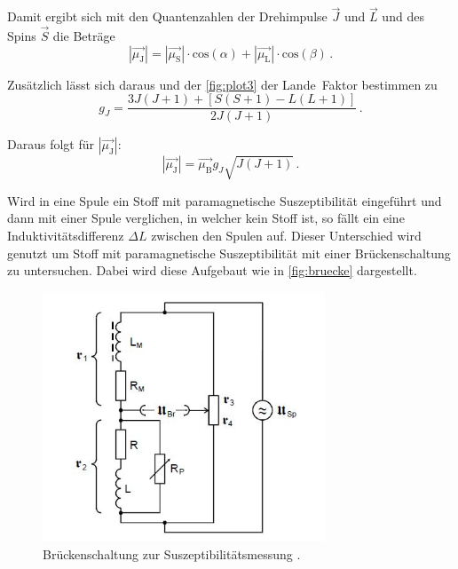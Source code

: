 Damit ergibt sich mit den Quantenzahlen der Drehimpulse $\vec{J}$ und $\vec{L}$ und des Spins $\vec{S}$ die Beträge
\begin{equation*}
        |\vec{\mu_\text{J}}| = |\vec{\mu_\text{S}}| \cdot \text{cos}\left(\alpha \right) + 
        |\vec{\mu_\text{L}}| \cdot \text{cos}\left(\beta \right) \, .
\end{equation*}

Zusätzlich lässt sich daraus und der \autoref{fig:plot3} der Lande~Faktor bestimmen zu
\begin{equation*}
        g_J = \frac{3J(J+1) + [S(S+1) - L(L+1)]} {2 J(J+1)} \, .
\end{equation*}

Daraus folgt für $|\vec{\mu_\text{J}}|$:
\begin{equation}
    |\vec{\mu_\text{J}}| = \vec{\mu_\text{B}} g_J \sqrt{J (J+1)}  \, .
\end{equation}


\noindent
Wird in eine Spule ein Stoff mit paramagnetische Suszeptibilität eingeführt und dann mit einer Spule verglichen, in welcher kein Stoff ist, so fällt ein eine Induktivitätsdifferenz
$\Delta L$ zwischen den Spulen auf. Dieser Unterschied wird genutzt um Stoff mit paramagnetische Suszeptibilität mit einer Brückenschaltung zu untersuchen.
Dabei wird diese Aufgebaut wie in \autoref{fig:bruecke} dargestellt.

\begin{figure}[H]
        \centering
        \includegraphics[width=0.75\textwidth]{Bilder/MessBruecke.JPG}
        \caption{Brückenschaltung zur Suszeptibilitätsmessung \cite{V606}.}
        \label{fig:bruecke}
\end{figure}

